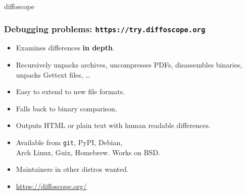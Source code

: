 \documentclass[14pt]{beamer}
\begin{document}
{

\begin{frame}{diffoscope}
 \frametitle{Debugging problems: \texttt{https://try.diffoscope.org}}

 \begin{itemize}
  \item Examines differences \textbf{in depth}.
  \item Recursively unpacks archives, uncompresses PDFs, disassembles
  binaries, unpacks Gettext files, …
  \item Easy to extend to new file formats.
  \item Falls back to binary comparison.
  \item Outputs HTML or plain text with human readable differences.
  \item Available from \texttt{git}, PyPI, Debian, \\
   Arch Linux, Guix, Homebrew. Works on BSD.
  \item Maintainers in other distros wanted.
  \item \url{https://diffoscope.org/}
 \end{itemize}
\end{frame}


}
\end{document}
